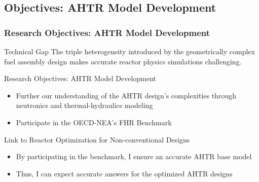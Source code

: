 \subsection{Objectives: AHTR Model Development}
    \begin{frame}
        \frametitle{Research Objectives: AHTR Model Development}
        \begin{block}{Technical Gap}
            The triple heterogeneity introduced by the geometrically complex 
            fuel assembly design makes accurate reactor physics simulations challenging. 
        \end{block}
        \begin{block}{Research Objectives: AHTR Model Development}
        \begin{itemize}
            \item Further our understanding of the AHTR design's complexities 
            through neutronics and thermal-hydraulics modeling
            \item Participate in the OECD-NEA's FHR Benchmark 
        \end{itemize}
        \end{block}
        \begin{block}{Link to Reactor Optimization for Non-conventional Designs}
        \begin{itemize}
        \item By participating in the benchmark, I ensure an accurate AHTR base model
        \item Thus, I can expect accurate answers for the optimized AHTR designs
        \end{itemize}
        \end{block}
    \end{frame}

